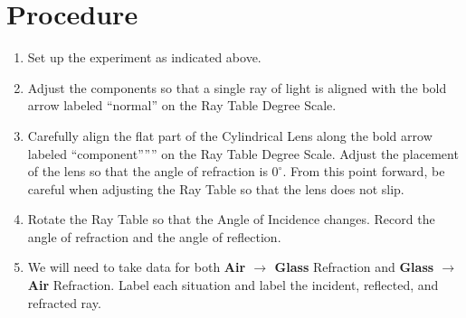 \documentclass[10pt]{exam}
\begin{document}
\section*{Procedure}
\begin{enumerate}
  \item Set up the experiment as indicated above.
  \item Adjust the components so that a single ray of light is aligned with the bold arrow labeled ``normal'' on the Ray Table Degree Scale.
  \item Carefully align the flat part of the Cylindrical Lens along the bold arrow labeled ``component''”'' on the Ray Table Degree Scale.  Adjust the placement of the lens so that the angle of refraction is $0^\circ$.  From this point forward, be careful when adjusting the Ray Table so that the lens does not slip.
  \item Rotate the Ray Table so that the Angle of Incidence changes.  Record the angle of refraction and the angle of reflection.
  \item We will need to take data for both {\bf Air $\rightarrow$ Glass} Refraction and {\bf Glass $\rightarrow$ Air} Refraction.  Label each situation and label the incident, reflected, and refracted ray. 
  
  \begin{center}
\end{center}
\end{enumerate}
\end{document}
